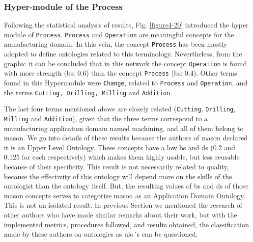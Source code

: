 \subsubsection{Hyper-module of the Process}\label{subsubsection4.2.5.3}

Following the statistical   analysis of results, Fig. \ref{figure4-20} introduced the hyper module of \texttt{Process}. \texttt{Process} and \texttt{Operation} are meaningful concepts for the manufacturing domain. In this vein, the concept \texttt{Process} has been mostly adopted to define ontologies related to this terminology. Nevertheless, from the graphic it can be concluded that in this network the concept \texttt{Operation} is found with more strength   (\gls{bs}: 0.6) than the concept \texttt{Process} (\gls{bs}: 0.4). Other terms found in this Hypermodule were \texttt{Change}, related to \texttt{Process} and \texttt{Operation}, and the terms \texttt{Cutting, Drilling, Milling} and \texttt{Addition}. 

The last four terms mentioned above are closely related (\texttt{Cutting}, \texttt{Drilling}, \texttt{Milling} and \texttt{Addition}), given that   the three terms correspond to a manufacturing application domain named machining, and all of them belong to \gls{mason}. We go into details of these results because the authors of \gls{mason} declared it is an Upper Level Ontology. These concepts have a low \gls{bs} and \gls{ds} (0.2 and 0.125 for each respectively) which makes them highly usable, but less reusable because of their specificity. This result is not necessarily related to quality, because the effectivity of this ontology will depend more on the skills of the ontologist than the ontology itself. But, the resulting values of \gls{bs} and \gls{ds} of those \gls{mason} concepts serves  to categorize \gls{mason} as an Application Domain Ontology. This is not an isolated result. In previous Section we  mentioned the research of other authors who have made similar remarks about their work, but with the implemented metrics,  procedures followed, and results obtained, the classification made by these authors  on  ontologies as \gls{ulo}´s can be questioned. 


